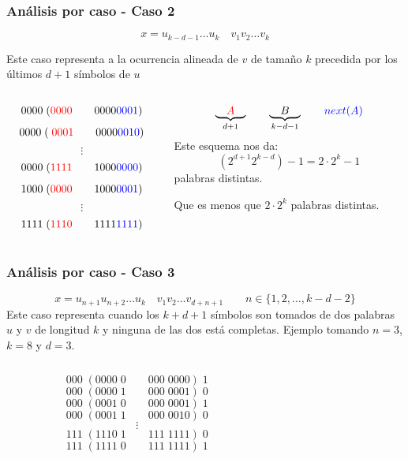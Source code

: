 \documentclass[10pt,mathserif]{beamer}%
\begin{document}
\begin{frame}
  \frametitle{Análisis por caso - Caso 2}
  $$ x = u_{k-d-1} \dots u_k \quad v_1 v_2 \dots v_k$$

  Este caso representa a la ocurrencia alineada de $v$ de tamaño $k$ precedida por los últimos $d+1$ símbolos de $u$
  
  \begin{columns}
    \begin{column}{0.5\textwidth}
      $$0000 \; (\textcolor{red}{0000} \qquad 0000\textcolor{blue}{0001})$$
      $$0000 \; (\; \textcolor{red}{0001} \qquad 0000\textcolor{blue}{0010})$$
      $$\vdots$$
      $$0000 \; (\textcolor{red}{1111} \qquad 1000\textcolor{blue}{0000})$$
      $$1000 \; (\textcolor{red}{0000} \qquad 1000\textcolor{blue}{0001})$$
      $$\vdots$$
      $$1111 \; (\textcolor{red}{1110} \qquad 1111\textcolor{blue}{1111})$$
    \end{column}
    \begin{column}{0.5\textwidth}  %
          \pause
          $$\underbrace{\quad \textcolor{red}{A} \quad }_{d +1} \qquad \underbrace{\quad B \quad }_{k - d - 1}  \qquad \textcolor{blue}{next(A)}$$
          \pause
          Este esquema nos da:
          $$(2^{d + 1} 2^{k-d})-1=  2 \cdot 2^k - 1$$
          palabras distintas.

          Que es menos que  $2 \cdot 2^k$ palabras distintas.
    \end{column}
    \end{columns}
\end{frame} 

\begin{frame}
  \frametitle{Análisis por caso - Caso 3}
  $$x = u_{n+1} u_{n+2} \dots u_k \quad  v_1 v_2 \dots v_{d+n+1}   \qquad n \in \{1,2,\dots ,k - d - 2\}  $$
  Este caso representa cuando los $k + d + 1$ símbolos son tomados de dos palabras $u$ y $v$ de longitud $k$ y ninguna de las dos está completas.
  Ejemplo tomando $n = 3$, $k = 8$ y $d = 3$.
  \begin{columns}
    \begin{column}{0.5\textwidth}
        $$000\; (0000\; 0 \qquad 000 \;0000 ) \;1$$
        $$000\; (0000\; 1 \qquad 000 \;0001 ) \;0$$
        $$000\; (0001\; 0 \qquad 000 \;0001 ) \;1$$
        $$000\; (0001\; 1 \qquad 000 \;0010 ) \;0$$
        $$\vdots$$
        $$111\; (1110\; 1 \qquad 111 \;1111 ) \;0$$
        $$111\; (1111\; 0 \qquad 111 \;1111 ) \;1$$
    \end{column}
    \begin{column}{0.5\textwidth}  %

    \end{column}
    \end{columns}
\end{frame}
\end{document}
